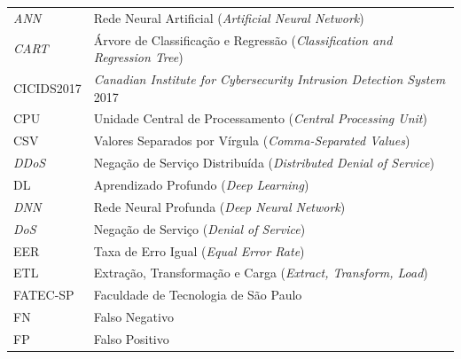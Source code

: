 \begin{longtable}{@{}p{3.8cm}p{\dimexpr\textwidth-3.8cm\relax}@{}}
    \textit{ANN}   & Rede Neural Artificial (\textit{Artificial Neural Network})                                                     \\[4pt]
    \textit{CART}  & Árvore de Classificação e Regressão (\textit{Classification and Regression Tree})                               \\[4pt]
    CICIDS2017     & \textit{Canadian Institute for Cybersecurity Intrusion Detection System} 2017                                   \\[4pt]
    CPU            & Unidade Central de Processamento (\textit{Central Processing Unit})                                             \\[4pt]
    CSV            & Valores Separados por Vírgula (\textit{Comma-Separated Values})                                                 \\[4pt]
    \textit{DDoS}  & Negação de Serviço Distribuída (\textit{Distributed Denial of Service})                                         \\[4pt]
    DL             & Aprendizado Profundo (\textit{Deep Learning})                                                                   \\[4pt]
    \textit{DNN}   & Rede Neural Profunda (\textit{Deep Neural Network})                                                             \\[4pt]
    \textit{DoS}   & Negação de Serviço (\textit{Denial of Service})                                                                 \\[4pt]
    EER            & Taxa de Erro Igual (\textit{Equal Error Rate})                                                                  \\[4pt]
    ETL            & Extração, Transformação e Carga (\textit{Extract, Transform, Load})                                             \\[4pt]
    FATEC-SP       & Faculdade de Tecnologia de São Paulo                                                                            \\[4pt]
    FN             & Falso Negativo                                                                                                  \\[4pt]
    FP             & Falso Positivo                                                                                                  \\[4pt]

\end{longtable}
